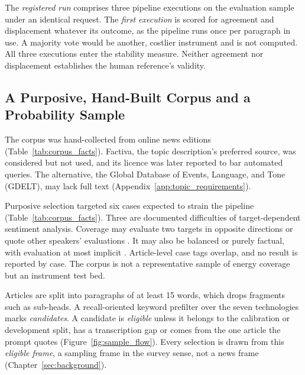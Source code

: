 The \emph{registered run} comprises three pipeline executions on the evaluation sample under an identical request. The \emph{first execution} is scored for agreement and displacement whatever its outcome, as the pipeline runs once per paragraph in use. A majority vote would be another, costlier instrument and is not computed. All three executions enter the stability measure. Neither agreement nor displacement establishes the human reference's validity.

\subsection{A Purposive, Hand-Built Corpus and a Probability Sample}\label{subsec:data_collection}

The corpus was hand-collected from online news editions (Table~\ref{tab:corpus_facts}). Factiva, the topic description's preferred source, was considered but not used, and its licence was later reported to bar automated queries. The alternative, the Global Database of Events, Language, and Tone (GDELT), may lack full text (Appendix~\ref{app:topic_requirements}).

Purposive selection targeted six cases expected to strain the pipeline (Table~\ref{tab:corpus_facts}). Three are documented difficulties of target-dependent sentiment analysis. Coverage may evaluate two targets in opposite directions \parencites[p.~1669]{hamborg2021newsmtsc}[p.~3594]{xing2020arts} or quote other speakers' evaluations \parencite[p.~610]{bastan2020authorsentiment}. It may also be balanced or purely factual, with evaluation at most implicit \parencite[p.~1664]{hamborg2021newsmtsc}. Article-level case tags overlap, and no result is reported by case. The corpus is not a representative sample of energy coverage but an instrument test bed.

Articles are split into paragraphs of at least 15 words, which drops fragments such as sub-heads. A recall-oriented keyword prefilter over the seven technologies marks \emph{candidates}. A candidate is \emph{eligible} unless it belongs to the calibration or development split, has a transcription gap or comes from the one article the prompt quotes (Figure~\ref{fig:sample_flow}). Every selection is drawn from this \emph{eligible frame}, a sampling frame in the survey sense, not a news frame (Chapter~\ref{sec:background}).



